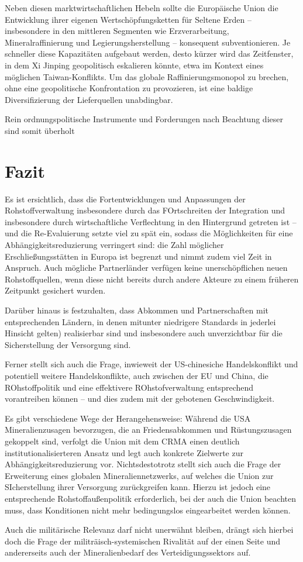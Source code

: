 \documentclass[12pt,a4paper,oneside]{book} %
\begin{document}
Neben diesen marktwirtschaftlichen Hebeln sollte die Europäische Union die Entwicklung ihrer eigenen Wertschöpfungsketten für Seltene Erden – insbesondere in den mittleren Segmenten wie Erzverarbeitung, Mineralraffinierung und Legierungsherstellung – konsequent subventionieren. Je schneller diese Kapazitäten aufgebaut werden, desto kürzer wird das Zeitfenster, in dem Xi Jinping geopolitisch eskalieren könnte, etwa im Kontext eines möglichen Taiwan-Konflikts. Um das globale Raffinierungsmonopol zu brechen, ohne eine geopolitische Konfrontation zu provozieren, ist eine baldige Diversifizierung der Lieferquellen unabdingbar.

Rein ordnungspolitische Instrumente und Forderungen nach Beachtung dieser sind somit überholt

\section{Fazit}

Es ist ersichtlich, dass die Fortentwicklungen und Anpassungen der Rohstoffverwaltung insbesondere durch das FOrtschreiten der Integration und insbesondere durch wirtschaftliche Verflechtung in den Hintergrund getreten ist -- und die Re-Evaluierung setzte viel zu spät ein, sodass die Möglichkeiten für eine Abhängigkeitsreduzierung verringert sind: die Zahl möglicher Erschließungsstätten in Europa ist begrenzt und nimmt zudem viel Zeit in Anspruch. Auch mögliche Partnerländer verfügen keine unerschöpflichen neuen Rohstoffquellen, wenn diese nicht bereits durch andere Akteure zu einem früheren Zeitpunkt gesichert wurden.

Darüber hinaus is festzuhalten, dass Abkommen und Partnerschaften mit entsprechenden Ländern, in denen mitunter niedrigere Standards in jederlei Hinsicht gelten) realisierbar sind und insbesondere auch unverzichtbar für die Sicherstellung der Versorgung sind.

Ferner stellt sich auch die Frage, inwieweit der US-chinesiche Handelskonflikt und potentiell weitere Handelskonflikte, auch zwischen der EU und China, die ROhstoffpolitik und eine effektivere ROhstofverwaltung entsprechend vorantreiben können -- und dies zudem mit der gebotenen Geschwindigkeit.

Es gibt verschiedene Wege der Herangehensweise: Während die USA Mineralienzusagen bevorzugen, die an Friedensabkommen und Rüstungszusagen gekoppelt sind, verfolgt die Union mit dem CRMA einen deutlich institutionalisierteren Ansatz und legt auch konkrete Zielwerte zur Abhängigkeitsreduzierung vor. Nichtsdestotrotz stellt sich auch die Frage der Erweiterung eines globalen Mineraliennetzwerks, auf welches die Union zur SIcherstellung ihrer Versorgung zurückgreifen kann. Hierzu ist jedoch eine entsprechende Rohstoffaußenpolitik erforderlich, bei der auch die Union beachten muss, dass Konditionen nicht mehr bedingungslos eingearbeitet werden können. 

Auch die militärische Relevanz darf nicht unerwähnt bleiben, drängt sich hierbei doch die Frage der militräisch-systemischen Rivalität auf der einen Seite und andererseits auch der Mineralienbedarf des Verteidigungssektors auf.

	
\end{document}
